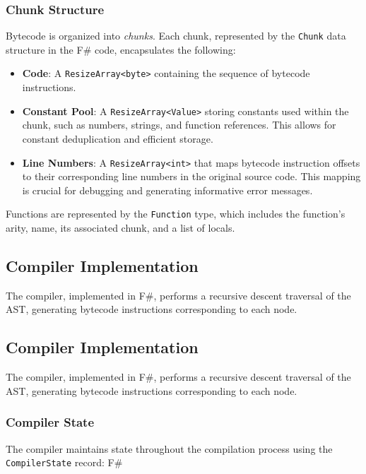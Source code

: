 \subsubsection{Chunk Structure}

Bytecode is organized into \textit{chunks}. Each chunk, represented by the \texttt{Chunk} data structure in the F\# code, encapsulates the following:

\begin{itemize}
    \item \textbf{Code}: A \texttt{ResizeArray<byte>} containing the sequence of bytecode instructions.
    \item \textbf{Constant Pool}: A \texttt{ResizeArray<Value>} storing constants used within the chunk, such as numbers, strings, and function references. This allows for constant deduplication and efficient storage.
    \item \textbf{Line Numbers}: A \texttt{ResizeArray<int>} that maps bytecode instruction offsets to their corresponding line numbers in the original source code. This mapping is crucial for debugging and generating informative error messages.
\end{itemize}

Functions are represented by the \texttt{Function} type, which includes the function's arity, name, its associated chunk, and a list of locals.

\subsection{Compiler Implementation}

The compiler, implemented in F\#, performs a recursive descent traversal of the AST, generating bytecode instructions corresponding to each node.

\subsection{Compiler Implementation}

The compiler, implemented in F\#, performs a recursive descent traversal of the AST, generating bytecode instructions corresponding to each node.

\subsubsection{Compiler State}

The compiler maintains state throughout the compilation process using the \texttt{CompilerState} record:
F\#

